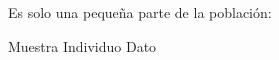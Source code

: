 
\question Es solo una pequeña parte de la población:

  \begin{oneparchoices}
    \CorrectChoice Muestra
    \choice Individuo
    \choice Dato
  \end{oneparchoices}
